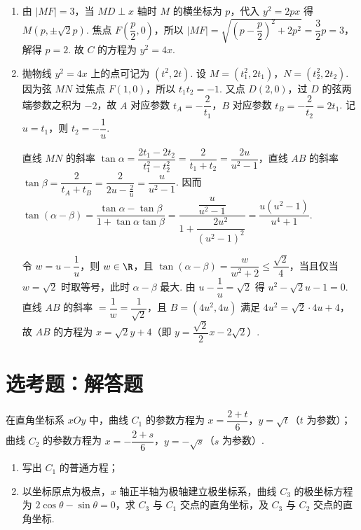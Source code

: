 \begin{solution}
\begin{enumerate}
\item 由 \(\lvert MF\rvert=3\)，当 \(MD\perp x\) 轴时 \(M\) 的横坐标为 \(p\)，代入 \(y^2=2px\) 得 \(M(p,\pm\sqrt2p)\). 焦点 \(F\left(\dfrac p2,0\right)\)，所以 \(\lvert MF\rvert=\sqrt{\left(p-\dfrac p2\right)^2+2p^2}=\dfrac32p=3\)，解得 \(p=2\). 故 \(C\) 的方程为 \(y^2=4x\).

\item 抛物线 \(y^2=4x\) 上的点可记为 \((t^2,2t)\). 设 \(M=(t_1^2,2t_1)\)，\(N=(t_2^2,2t_2)\). 因为弦 \(MN\) 过焦点 \(F(1,0)\)，所以 \(t_1t_2=-1\). 又点 \(D(2,0)\)，过 \(D\) 的弦两端参数之积为 \(-2\)，故 \(A\) 对应参数 \(t_A=-\dfrac2{t_1}\)，\(B\) 对应参数 \(t_B=-\dfrac2{t_2}=2t_1\). 记 \(u=t_1\)，则 \(t_2=-\dfrac1u\).

直线 \(MN\) 的斜率 \(\tan\alpha=\dfrac{2t_1-2t_2}{t_1^2-t_2^2}=\dfrac2{t_1+t_2}=\dfrac{2u}{u^2-1}\)，直线 \(AB\) 的斜率 \(\tan\beta=\dfrac2{t_A+t_B}=\dfrac2{2u-\frac2u}=\dfrac u{u^2-1}\). 因而
\(\tan(\alpha-\beta)=\dfrac{\tan\alpha-\tan\beta}{1+\tan\alpha\tan\beta}=\dfrac{\dfrac u{u^2-1}}{1+\dfrac{2u^2}{(u^2-1)^2}}=\dfrac{u(u^2-1)}{u^4+1}\).

令 \(w=u-\dfrac1u\)，则 \(w\in\R\)，且 \(\tan(\alpha-\beta)=\dfrac{w}{w^2+2}\le\dfrac{\sqrt2}4\)，当且仅当 \(w=\sqrt2\) 时取等号，此时 \(\alpha-\beta\) 最大. 由 \(u-\dfrac1u=\sqrt2\) 得 \(u^2-\sqrt2u-1=0\). 直线 \(AB\) 的斜率 \(=\dfrac1w=\dfrac1{\sqrt2}\)，且 \(B=(4u^2,4u)\) 满足 \(4u^2=\sqrt2\cdot4u+4\)，故 \(AB\) 的方程为 \(x=\sqrt2y+4\)（即 \(y=\dfrac{\sqrt2}2x-2\sqrt2\)）.
\end{enumerate}
\end{solution}

\section{选考题：解答题}

\begin{problem}
在直角坐标系 \(xOy\) 中，曲线 \(C_1\) 的参数方程为 \(x=\dfrac{2+t}{6}\)，\(y=\sqrt{t}\)（\(t\) 为参数）；曲线 \(C_2\) 的参数方程为 \(x=-\dfrac{2+s}{6}\)，\(y=-\sqrt{s}\)（\(s\) 为参数）.

\begin{enumerate}
\item 写出 \(C_1\) 的普通方程；
\item 以坐标原点为极点，\(x\) 轴正半轴为极轴建立极坐标系，曲线 \(C_3\) 的极坐标方程为 \(2\cos\theta-\sin\theta=0\)，求 \(C_3\) 与 \(C_1\) 交点的直角坐标，及 \(C_3\) 与 \(C_2\) 交点的直角坐标.
\end{enumerate}
\end{problem}


